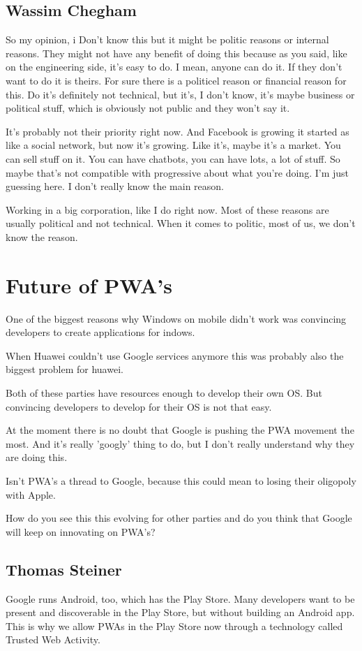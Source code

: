 		\subsection{Wassim Chegham}
			So my opinion, i Don't know this but it might be politic reasons or internal reasons. They might not have any benefit of doing this because as you said, like on the engineering side, it's easy to do. I mean, anyone can do it. If they don't want to do it is theirs. For sure there is a politicel reason or financial reason for this. Do it's definitely not technical, but it's, I don't know, it's maybe business or political stuff, which is obviously not public and they won't say it. 
			
			
			It's probably not their priority right now. And Facebook is growing it started as like a social network, but now it's growing. Like it's, maybe it's a market. You can sell stuff on it. You can have chatbots, you can have lots, a lot of stuff. So maybe that's not compatible with progressive about what you're doing. I'm just guessing here. I don't really know the main reason. 
			
			Working in a big corporation, like I do right now. Most of these reasons are usually political and not technical. When it comes to politic, most of us, we don't know the reason.
		
	
	\section{Future of PWA's }
		One of the biggest reasons why Windows on mobile didn't work was convincing developers to create applications for indows. 
		
		When Huawei couldn't use Google services anymore this was probably also the biggest problem for huawei.
		
		Both of these parties have resources enough to develop their own OS. But convincing developers to develop for their OS is not that easy.
		
		At the moment there is no doubt that Google is pushing the PWA movement the most. And it's really 'googly' thing to do, but I don't really understand why they are doing this.
		
		Isn't PWA's a thread to Google, because this could mean to losing their oligopoly with Apple.
		
		How do you see this this evolving for other parties and do you think that Google will keep on innovating on PWA's?
		
		\subsection{Thomas Steiner}
			Google runs Android, too, which has the Play Store. Many developers want to be present and discoverable in the Play Store, but without building an Android app. This is why we allow PWAs in the Play Store now through a technology called Trusted Web Activity. 
			

